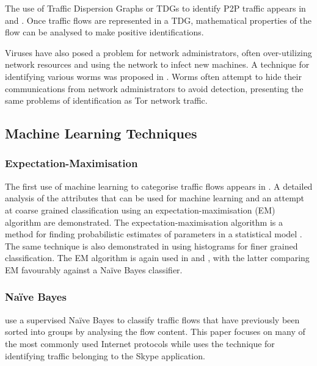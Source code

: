 \documentclass{ecuthesis}
\begin{document}
The use of Traffic Dispersion Graphs or TDGs to identify P2P traffic appears in
\textcite{Iliofotou:2008p6373} and \textcite{Iliofotou:2009p6461}. Once traffic
flows are represented in a TDG, mathematical properties of the flow can be
analysed to make positive identifications.

Viruses have also posed a problem for network administrators, often
over-utilizing network resources and using the network to infect new machines.
A technique for identifying various worms was proposed in
\textcite{Lazarevic:2003p6450}. Worms often attempt to hide their communications
from network administrators to avoid detection, presenting the same problems of
identification as Tor network traffic.

\subsection{Machine Learning Techniques}

\subsubsection{Expectation-Maximisation}

The first use of machine learning to categorise traffic flows appears in
\textcite{McGregor:2004p3826}. A detailed analysis of the attributes that can
be used for machine learning and an attempt at coarse grained classification
using an expectation-maximisation (EM) algorithm are demonstrated. The
expectation-maximisation algorithm is a method for finding probabilistic
estimates of parameters in a statistical model \parencite{UW:2010p7083}. The
same technique is also demonstrated in \textcite{Soule:2004p3817} using
histograms for finer grained classification.  The EM algorithm is again used in
\textcite{Zander:2005p6212} and \textcite{Erman:2006p3825}, with the latter
comparing EM favourably against a Na\"{i}ve Bayes classifier.

\subsubsection{Na\"{i}ve Bayes}

\textcite{Moore:2005p3827} use a supervised Na\"{i}ve Bayes to classify traffic
flows that have previously been sorted into groups by analysing the flow
content. This paper focuses on many of the most commonly used Internet
protocols while \textcite{Bonfiglio:2007p6453} uses the technique for
identifying traffic belonging to the Skype application.
\end{document}
